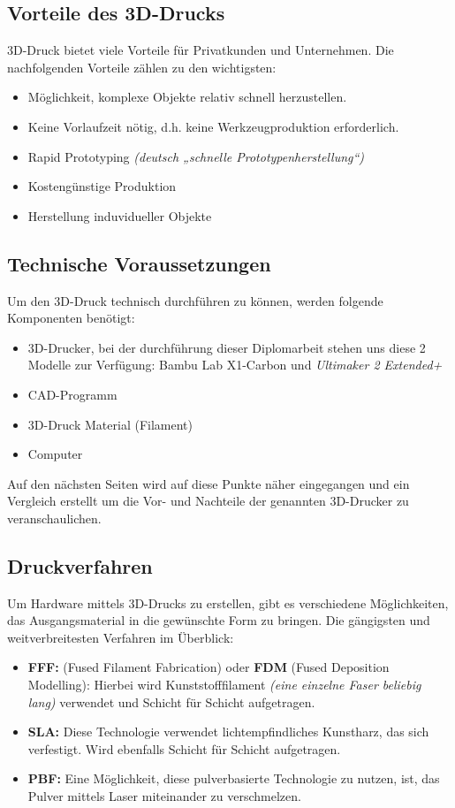 \subsection{Vorteile des 3D-Drucks}
3D-Druck bietet viele Vorteile für Privatkunden und Unternehmen. Die nachfolgenden Vorteile zählen zu den wichtigsten:
\begin{itemize}
	\item Möglichkeit, komplexe Objekte relativ schnell herzustellen.
	\item Keine Vorlaufzeit nötig, d.h. keine Werkzeugproduktion erforderlich.
	\item Rapid Prototyping \emph{(deutsch „schnelle Prototypenherstellung“)}
	\item Kostengünstige Produktion
	\item Herstellung induvidueller Objekte
\end{itemize} \cite{3D-Druck-Vorteile}

\subsection{Technische Voraussetzungen}
Um den 3D-Druck technisch durchführen zu können, werden folgende Komponenten benötigt:
\begin{itemize} 
	\item 3D-Drucker, bei der durchführung dieser Diplomarbeit stehen uns diese 2 Modelle zur Verfügung: Bambu Lab X1-Carbon  und \emph{Ultimaker 2 Extended+}
	\item CAD-Programm
	\item 3D-Druck Material (Filament)
	\item Computer
\end{itemize}
Auf den nächsten Seiten wird auf diese Punkte näher eingegangen und ein Vergleich erstellt um die Vor- und Nachteile der genannten 3D-Drucker zu veranschaulichen. \cite{3ds}


\subsection{Druckverfahren}

Um Hardware mittels 3D-Drucks zu erstellen, gibt es verschiedene Möglichkeiten, das Ausgangsmaterial in die gewünschte Form zu bringen. Die gängigsten und weitverbreitesten Verfahren im Überblick: 

\begin{itemize}
	\item \textbf{FFF:} (Fused Filament Fabrication) oder \textbf{FDM} (Fused Deposition Modelling): Hierbei wird Kunststofffilament \emph{(eine einzelne Faser beliebig lang)} verwendet und Schicht für Schicht aufgetragen.
	\item \textbf{SLA:} Diese Technologie verwendet lichtempfindliches Kunstharz, das sich verfestigt. Wird ebenfalls Schicht für Schicht aufgetragen.
	\item \textbf{PBF:} Eine Möglichkeit, diese pulverbasierte Technologie zu nutzen, ist, das Pulver mittels Laser miteinander zu verschmelzen. \cite{kaffka} \cite{3ds}
\end{itemize}

